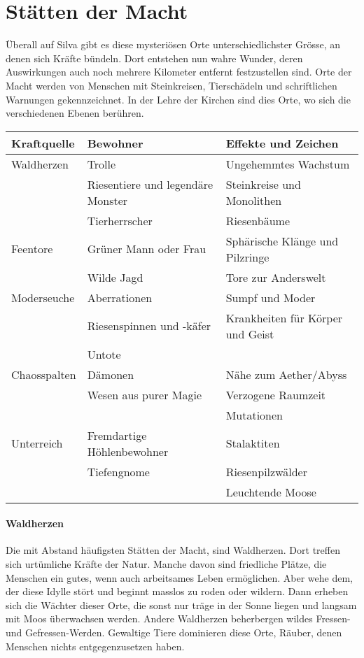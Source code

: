 \documentclass[10pt,twoside,twocolumn,openany]{book}
\begin{document}
\newpage \section{Stätten der Macht}
\begin{multicols}{2}
	Überall auf Silva gibt es diese mysteriösen Orte unterschiedlichster Grösse, an denen sich Kräfte bündeln. Dort entstehen nun wahre Wunder, deren Auswirkungen auch noch mehrere Kilometer entfernt festzustellen sind. Orte der Macht werden von Menschen mit Steinkreisen, Tierschädeln und schriftlichen Warnungen gekennzeichnet. In der Lehre der Kirchen sind dies Orte, wo sich die verschiedenen Ebenen berühren.
	
\begin{table*}
	\centering
	\begin{tabular}{lll}
			\textbf{Kraftquelle} & \textbf{Bewohner} & \textbf{Effekte und Zeichen} \\
			\hline Waldherzen & Trolle & Ungehemmtes Wachstum \\ 
			& Riesentiere und legendäre Monster & Steinkreise und Monolithen \\ 
			& Tierherrscher & Riesenbäume \\ 
			\hline Feentore & Grüner Mann oder Frau & Sphärische Klänge und Pilzringe \\ 
			& Wilde Jagd & Tore zur Anderswelt \\ 
			\hline Moderseuche & Aberrationen & Sumpf und Moder \\ 
			& Riesenspinnen und -käfer & Krankheiten für Körper und Geist \\ 
			& Untote &  \\ 
			\hline Chaosspalten & Dämonen & Nähe zum Aether/Abyss \\ 
			& Wesen aus purer Magie & Verzogene Raumzeit \\ 
			&  & Mutationen \\ 
			\hline Unterreich & Fremdartige Höhlenbewohner & Stalaktiten \\ 
			& Tiefengnome & Riesenpilzwälder \\
			&  & Leuchtende Moose \\
	\end{tabular}	
\end{table*}
	
	\paragraph{Waldherzen}
	Die mit Abstand häufigsten Stätten der Macht, sind Waldherzen. Dort treffen sich urtümliche Kräfte der Natur. Manche davon sind friedliche Plätze, die Menschen ein gutes, wenn auch arbeitsames Leben ermöglichen. Aber wehe dem, der diese Idylle stört und beginnt masslos zu roden oder wildern. Dann erheben sich die Wächter dieser Orte, die sonst nur träge in der Sonne liegen und langsam mit Moos überwachsen werden.
	Andere Waldherzen beherbergen wildes Fressen- und Gefressen-Werden. Gewaltige Tiere dominieren diese Orte, Räuber, denen Menschen nichts entgegenzusetzen haben.
	

\end{multicols}
\end{document}
